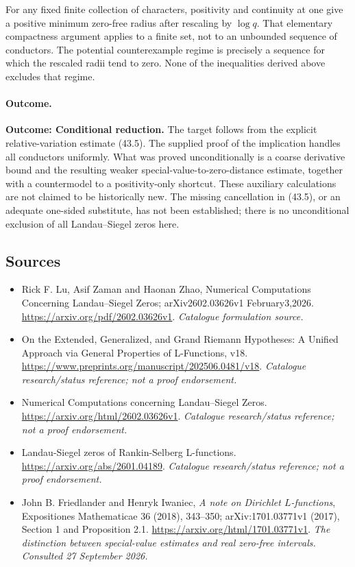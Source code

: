 \documentclass[11pt,a4paper]{article}
\numberwithin{equation}{section}
\begin{document}
For any fixed finite collection of characters, positivity and continuity
at one give a positive minimum zero-free radius after rescaling by
$\log q$. That elementary compactness argument applies to a finite set,
not to an unbounded sequence of conductors. The potential counterexample
regime is precisely a sequence for which the rescaled radii tend to zero.
None of the inequalities derived above excludes that regime.

\paragraph{Outcome.}
\textbf{Outcome: Conditional reduction.}
The target follows from the explicit relative-variation estimate (43.5).
The supplied proof of the implication handles all conductors uniformly.
What was proved unconditionally is a coarse derivative bound and the
resulting weaker special-value-to-zero-distance estimate, together with a
countermodel to a positivity-only shortcut. These auxiliary calculations
are not claimed to be historically new. The missing cancellation in
(43.5), or an adequate one-sided substitute, has not been established;
there is no unconditional exclusion of all Landau--Siegel zeros here.
\subsection{Sources}
\begin{itemize}\raggedright
\item[\textnormal{[S1]}]\hypertarget{source:statement:1}{} Rick F. Lu, Asif Zaman and Haonan Zhao, Numerical Computations Concerning Landau–Siegel Zeros; arXiv2602.03626v1 February3,2026.
\url{https://arxiv.org/pdf/2602.03626v1}.
{\small\textit{Catalogue formulation source.}}
\item[\textnormal{[S2]}]\hypertarget{source:statement:2}{} On the Extended, Generalized, and Grand Riemann Hypotheses: A Unified Approach via General Properties of L-Functions, v18.
\url{https://www.preprints.org/manuscript/202506.0481/v18}.
{\small\textit{Catalogue research/status reference; not a proof endorsement.}}
\item[\textnormal{[S3]}]\hypertarget{source:statement:3}{} Numerical Computations concerning Landau–Siegel Zeros.
\url{https://arxiv.org/html/2602.03626v1}.
{\small\textit{Catalogue research/status reference; not a proof endorsement.}}
\item[\textnormal{[S4]}]\hypertarget{source:statement:4}{} Landau-Siegel zeros of Rankin-Selberg L-functions.
\url{https://arxiv.org/abs/2601.04189}.
{\small\textit{Catalogue research/status reference; not a proof endorsement.}}
\item[\textnormal{[E1]}]\hypertarget{extra:statement:1}{} John B. Friedlander and Henryk Iwaniec,
\emph{A note on Dirichlet $L$-functions}, Expositiones Mathematicae 36 (2018),
343--350; arXiv:1701.03771v1 (2017), Section 1 and Proposition 2.1.
\url{https://arxiv.org/html/1701.03771v1}.
{\small\textit{The distinction between special-value estimates and real zero-free intervals. Consulted 27 September 2026.}}
\end{itemize}
\end{document}
